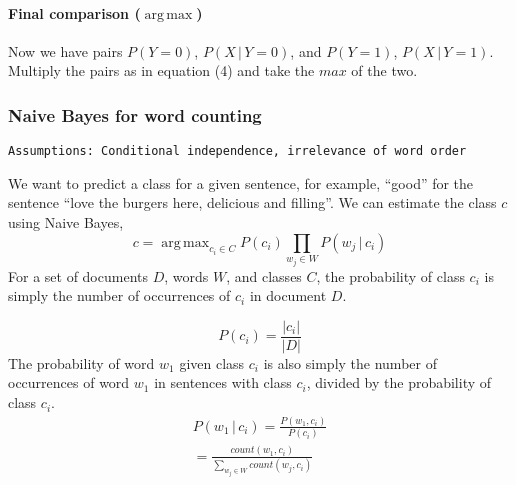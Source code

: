 \documentclass[9pt,twocolumn]{article}
\DeclareMathOperator*{\argmax}{arg\,max}
\begin{document}
\paragraph*{Final comparison ($\argmax$)}
Now we have pairs $P(Y=0)$, $P(X\,|\,Y=0)$, and $P(Y=1)$, $P(X\,|\,Y=1)$. Multiply the pairs as in equation (4)	and take the $max$ of the two.

\subsubsection*{Naive Bayes for word counting}
\begin{lstlisting}
Assumptions: Conditional independence, irrelevance of word order
\end{lstlisting}
We want to predict a class for a given sentence, for example, ``good'' for the sentence ``love the burgers here, delicious and filling''. We can estimate the class $c$ using Naive Bayes,
\begin{equation}
	c = \argmax	_{c_i\in C} P(c_i) \prod_{w_j\in W} P(w_j\,|\,c_i)
\end{equation}
For a set of documents $D$, words $W$, and classes $C$, the probability of class $c_i$ is simply the number of occurrences of $c_i$ in document $D$.

\begin{equation}
	P(c_i) = \frac{|c_i|}{|D|}
\end{equation}
The probability of word $w_1$ given class $c_i$ is also simply the number of occurrences of word $w_1$ in sentences with class $c_i$, divided by the probability of class $c_i$.
\begin{equation}
\begin{split}
	P(w_1\,|\,c_i) = \frac{P(w_1,c_i)}{P(c_i)}\\
	= \frac{count(w_1,c_i)}{\sum_{w_j\in W}count(w_j,c_i)}
\end{split}
\end{equation}
\end{document}
